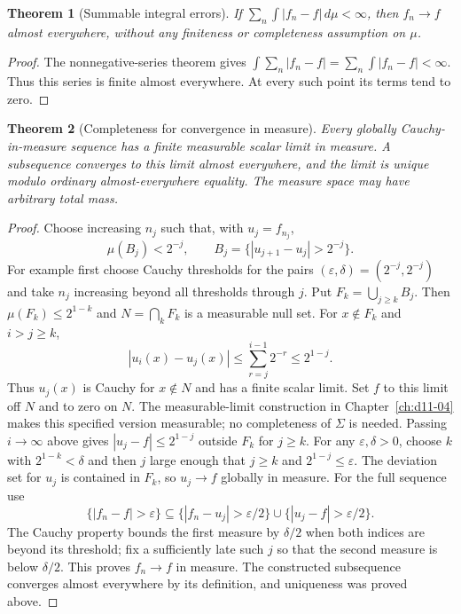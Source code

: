 \documentclass[11pt,oneside,openany]{book}
\newtheorem{theorem}{Theorem}[chapter]
\theoremstyle{definition}
\theoremstyle{remark}
\newcommand{\eps}{\varepsilon}\newcommand{\ee}{\varepsilon}
\newcommand{\family}[1]{}
\begin{document}
\begin{theorem}[Summable integral errors]
\family{D11.07.summable_errors_ae}\label{d11:07:summable-errors-ae}
If $\sum_n\int|f_n-f|\,d\mu<\infty$, then $f_n\to f$ almost everywhere,
without any finiteness or completeness assumption on $\mu$.
\end{theorem}
\begin{proof}
The nonnegative-series theorem gives
$\int\sum_n|f_n-f|=\sum_n\int|f_n-f|<\infty$.
Thus this series is finite almost everywhere. At every such point its
terms tend to zero.
\end{proof}

\begin{theorem}[Completeness for convergence in measure]
\family{D11.07.cauchy_measure_complete}\label{d11:07:cauchy-measure-complete}
Every globally Cauchy-in-measure sequence has a finite measurable scalar
limit in measure. A subsequence converges to this limit almost everywhere,
and the limit is unique modulo ordinary almost-everywhere equality.
The measure space may have arbitrary total mass.
\end{theorem}
\begin{proof}
Choose increasing $n_j$ such that, with $u_j=f_{n_j}$,
\[
 \mu(B_j)<2^{-j},\qquad B_j=\{|u_{j+1}-u_j|>2^{-j}\}.
\]
For example first choose Cauchy thresholds for the pairs
$(\eps,\delta)=(2^{-j},2^{-j})$ and take $n_j$ increasing beyond all
thresholds through $j$. Put $F_k=\bigcup_{j\geq k}B_j$.
Then $\mu(F_k)\leq2^{1-k}$ and $N=\bigcap_kF_k$ is a measurable null
set. For $x\notin F_k$ and $i>j\geq k$,
\[
 |u_i(x)-u_j(x)|\leq\sum_{r=j}^{i-1}2^{-r}\leq2^{1-j}.
\]
Thus $u_j(x)$ is Cauchy for $x\notin N$ and has a finite scalar limit.
Set $f$ to this limit off $N$ and to zero on $N$. The measurable-limit
construction in Chapter~\ref{ch:d11-04} makes this specified version
measurable; no completeness of $\Sigma$ is needed. Passing $i\to\infty$
above gives $|u_j-f|\leq2^{1-j}$ outside $F_k$ for $j\geq k$.
For any $\eps,\delta>0$, choose $k$ with $2^{1-k}<\delta$ and then $j$
large enough that $j\geq k$ and $2^{1-j}\leq\eps$.
The deviation set for $u_j$ is contained in $F_k$, so $u_j\to f$ globally
in measure. For the full sequence use
\[
 \{|f_n-f|>\eps\}\subseteq
 \{|f_n-u_j|>\eps/2\}\cup\{|u_j-f|>\eps/2\}.
\]
The Cauchy property bounds the first measure by $\delta/2$ when both
indices are beyond its threshold; fix a sufficiently late such $j$ so
that the second measure is below $\delta/2$. This proves $f_n\to f$ in
measure. The constructed subsequence converges almost everywhere by its
definition, and uniqueness was proved above.
\end{proof}
\end{document}
